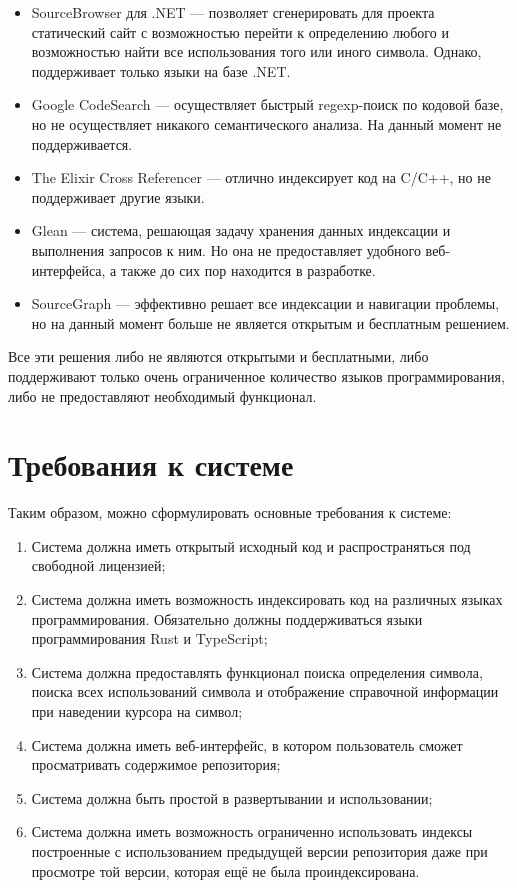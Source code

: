 \begin{itemize}
    \item SourceBrowser \cite{SourceBrowser} для .NET — позволяет сгенерировать для проекта статический сайт с возможностью перейти к определению любого  и возможностью найти все использования того или иного символа. Однако, поддерживает только языки на базе .NET.
    
    \item Google CodeSearch \cite{rsc-regexp4} — осуществляет быстрый regexp-поиск по кодовой базе, но не осуществляет никакого семантического анализа. На данный момент не поддерживается.
    
    \item The Elixir Cross Referencer \cite{elixir-crossrefrencer} — отлично индексирует код на C/C++, но не поддерживает другие языки.
    
    \item Glean \cite{facebook-Glean} — система, решающая задачу хранения данных индексации и выполнения запросов к ним. Но она не предоставляет удобного веб-интерфейса, а также до сих пор находится в разработке.
    
    \item SourceGraph \cite{miljenovic2010sourcegraph} — эффективно решает все индексации и навигации проблемы, но на данный момент больше не является открытым и бесплатным решением.
\end{itemize}

Все эти решения либо не являются открытыми и бесплатными, либо поддерживают только очень ограниченное количество языков программирования, либо не предоставляют необходимый функционал.

\section{Требования к системе}

Таким образом, можно сформулировать основные требования к системе:

\begin{enumerate}
    \item Система должна иметь открытый исходный код и распространяться под свободной лицензией;
    \item Система должна иметь возможность индексировать код на различных языках программирования. Обязательно должны поддерживаться языки программирования Rust и TypeScript;
    \item Система должна предоставлять функционал поиска определения символа, поиска всех использований символа и отображение справочной информации при наведении курсора на символ;
    \item Система должна иметь веб-интерфейс, в котором пользователь сможет просматривать содержимое репозитория;
    \item Система должна быть простой в развертывании и использовании;
    \item Система должна иметь возможность ограниченно использовать индексы построенные с использованием предыдущей версии репозитория даже при просмотре той версии, которая ещё не была проиндексирована.
\end{enumerate}

